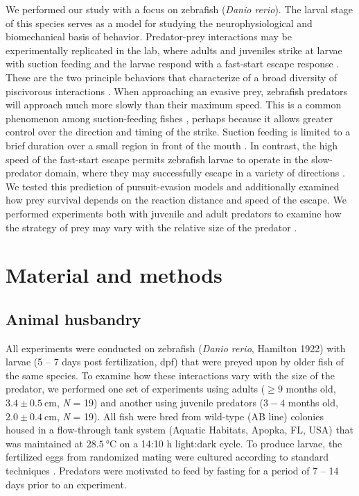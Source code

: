 \documentclass[]{rsos}%
\begin{document}
We performed our study with a focus on zebrafish (\textit{Danio rerio}). 
The larval stage of this species serves as a model for studying the neurophysiological \cite{Bianco:2015gm,Bagnall:2014iu,Huang:2013vj} and biomechanical \cite{Muller:2004hp,Li:2016cy} basis of behavior.
Predator-prey interactions may be experimentally replicated in the lab, where adults and juveniles strike at larvae with suction feeding and the larvae respond with a fast-start escape response \cite{Stewart:2013bha}.
These are the two principle behaviors that characterize of a broad diversity of piscivorous interactions \cite{Weihs:1984tb,Walker:2005vn,Higham:2007go,Higham:2005iu}. 
When approaching an evasive prey, zebrafish predators will approach much more slowly than their maximum speed.
This is a common phenomenon among suction-feeding fishes \cite{Higham:2005iu,Higham:2007go}, perhaps because it allows greater control over the direction and timing of the strike.
Suction feeding is limited to a brief duration over a small region in front of the mouth \cite{Holzman:2008jc,Holzman:2009uu}. 
In contrast, the high speed of the fast-start escape permits zebrafish larvae to operate in the slow-predator domain, where they may successfully escape in a variety of directions \cite{Soto:2015cj}.
We tested this prediction of pursuit-evasion models and additionally examined how prey survival depends on the reaction distance and speed of the escape.  
We performed experiments both with juvenile and adult predators to examine how the strategy of prey may vary with the relative size of the predator \cite{Fuiman:1994td}.


\section{Material and methods}

\subsection{Animal husbandry}
All experiments were conducted on zebrafish (\textit{Danio rerio}, Hamilton 1922) with larvae (5 -- 7 days post fertilization, dpf) that were preyed upon by older fish of the same species. 
To examine how these interactions vary with the size of the predator, we performed one set of experiments using adults ($\geq 9$ months old, $3.4 \pm \SI{0.5}{\cm}$, \textit{N} = 19) and another using juvenile predators ($3-4$ months old, $2.0  \pm  \SI{0.4}{\cm}$, \textit{N} = 19).
All fish were bred from wild-type (AB line) colonies housed in a flow-through tank system (Aquatic Habitats, Apopka, FL, USA) that was maintained at $\SI{28.5}{\celsius}$ on a 14:10 h light:dark cycle. 
To produce larvae, the fertilized eggs from randomized mating were cultured according to standard techniques \cite{Westerfield:UXiBrEuA}.
Predators were motivated to feed by fasting for a period of 7 -- 14 days prior to an experiment.
\end{document}

